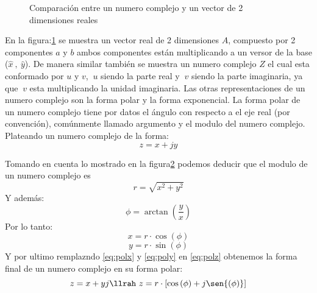 \begin{figure}[H]%
\centering
    \begin{minipage}{0.5\textwidth}
    \centering
        
    \end{minipage}%
    \begin{minipage}{0.4\textwidth}
    \centering
        
    \label{fig:test2}
    \end{minipage}%
    \caption{Comparación entre un numero complejo y un vector de 2 dimensiones reales}
    \label{fig:compri}
\end{figure}
En la figura:\ref{fig:compri} se muestra un vector real de 2 dimensiones $A$, compuesto por 2 componentes $a$ y $b$ ambos componentes están multiplicando a un versor de la base ($\hat{x}\ ,\ \hat{y}$). De manera similar también se muestra un numero complejo $Z$ el cual esta conformado por $u$ y $v$, $\ u$ siendo la parte real y $\ v$ siendo la parte imaginaria, ya que $\ v$ esta multiplicando la unidad imaginaria.
Las otras representaciones de un numero complejo son la forma polar y la forma exponencial.
La forma polar de un numero complejo tiene por datos el ángulo con respecto a el eje real (por convención), comúnmente llamado argumento y el modulo del numero complejo. Plateando un numero complejo de la forma:
\begin{equation}\label{eq:polz}
    z=x+jy
\end{equation}
\begin{figure}[H]
    \centering
        
    \label{fig:Polar}
\end{figure}
Tomando en cuenta lo mostrado en la figura\ref{fig:Polar} podemos deducir que el modulo de un numero complejo es
\begin{equation}\label{eq:polr}
    r=\sqrt{x^2+y^2}
\end{equation}
Y además:
\begin{equation}\label{eq:polt}
    \phi=\arctan{(\dfrac{y}{x})}
\end{equation}
Por lo tanto:
\begin{equation}\label{eq:polx}
    x=r\cdot\cos{(\phi)}
\end{equation}
\begin{equation}\label{eq:poly}
    y=r\cdot\sin{(\phi)}
\end{equation}
Y por ultimo remplazndo \ref{eq:polx} y \ref{eq:poly} en \ref{eq:polz} obtenemos la forma final de un numero complejo en su forma polar:
\begin{equation}\label{eq:defPol}
    z=x+yj \llrah \ z=r\cdot[\cos{(\phi)}+j\sen{(\phi)}]
\end{equation}
